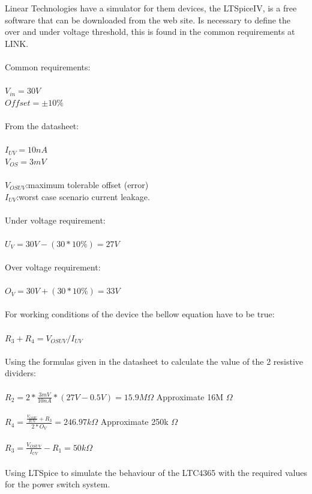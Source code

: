 Linear Technologies have a simulator for them devices, the LTSpiceIV, is a free software that can be downloaded from the web site.
Is necessary to define the over and under voltage threshold, this is found in the common requirements at LINK.\\
\\
Common requirements:\\\\
$V_{in} = 30V$ \\
$Offset = \pm 10\% $\\
\\
From the datasheet:\\\\
$ I_{UV} = 10nA $ \\
$ V_{OS} = 3mV $\\
\\
$V_{OSUV}$:maximum tolerable offset (error)\\
$I_{UV}$:worst case scenario current leakage.\\
\\
Under voltage requirement:\\\\
$ U_V=30V-(30*10\%)=27V $\\
\\
Over voltage requirement:\\\\
$ O_V=30V+(30*10\%)=33V $\\
\\
For working conditions of the device the bellow equation have to be true:\\\\
$ R_3+R_4=V_{OSUV}/I_{UV} $\\
\\
Using the formulas given in the datasheet to calculate the value of the 2 resistive dividers:\\\\
$ R_2 = 2*\frac{3mV}{10nA}*(27V-0.5V) = 15.9M\Omega $ Approximate 16M $\Omega $\\ 
\\
$ R_4 = \frac{\frac{V_{OSIU}}{I{UV}}+R_3}{2*O_V} = 246.97k\Omega $ Approximate 250k $\Omega $\\ 
\\
$ R_3 = \frac{V_{OSUV}}{I_{UV}}-R_1 = 50k\Omega $\\
\\

Using LTSpice to simulate the behaviour of the LTC4365 with the required values for the power switch system.

